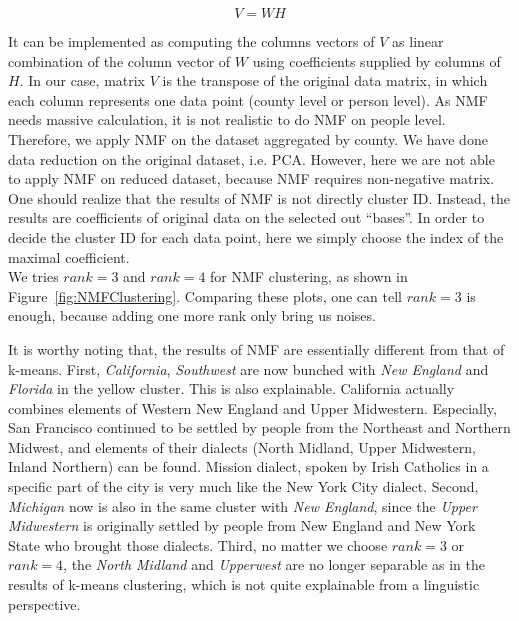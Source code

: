 $$V = WH$$

\qquad It can be implemented as computing the columns vectors of $V$ as linear combination 
of the column vector of $W$ using coefficients supplied by columns of $H$.
In our case, matrix $V$ is the transpose of the original data matrix, in which each column
represents one data point (county level or person level). As NMF needs massive calculation, 
it is not realistic to do NMF on people level. Therefore, we apply NMF on the dataset 
aggregated by county.  We have done data reduction on the original dataset, i.e. PCA. 
However, here we are not able to apply NMF on reduced dataset, because NMF requires 
non-negative matrix.\\

\qquad One should realize that the results of NMF is not directly cluster ID. Instead, the 
results are coefficients of original data on the selected out ``bases''. In order to decide the 
cluster ID for each data point, here we simply choose the index of the maximal coefficient.\\

\qquad We tries $rank=3$ and $rank=4$ for NMF clustering, as shown
in Figure~\ref{fig:NMFClustering}. Comparing these plots, one can tell $rank=3$  is enough, 
because adding one more rank only bring us noises. 

\qquad It is worthy noting that, the results of NMF are essentially different from that of k-means. First, \textit{California}, \textit{Southwest} are now bunched with \textit{New England} and \textit{Florida} in the yellow cluster. This is also explainable. California actually combines elements of Western New England and Upper Midwestern. Especially, San Francisco continued to be settled by people from the Northeast and Northern Midwest, and elements of their dialects (North Midland, Upper Midwestern, Inland Northern) can be found. Mission dialect, spoken by Irish Catholics in a specific part of the city is very much like the New York City dialect. Second, \textit{Michigan} now is also in the same cluster with \textit{New England}, since the \textit{Upper Midwestern} is originally settled by people from New England and New York State who brought those dialects. Third, no matter we choose $rank=3$ or $rank=4$, the \textit{North Midland} and \textit{Upperwest} are no longer separable as in the results of k-means clustering, which is not quite explainable from a linguistic perspective. 



